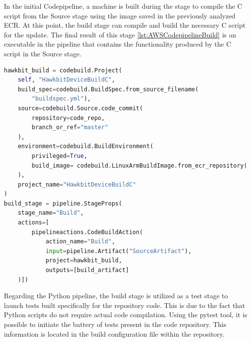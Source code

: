 In the initial Codepipeline, a machine is built during the stage to compile the C script from the Source stage using the image saved in the previously analyzed ECR. At this point, the build stage can compile and build the necessary C script for the update. The final result of this stage \ref{lst:AWSCodepipelineBuild} is an executable in the pipeline that contains the functionality produced by the C script in the Source stage.
\begin{lstlisting}[language=Python, caption={CDK Code for the Codecommit build stage set up}, label=lst:AWSCodepipelineBuild]
hawkbit_build = codebuild.Project(
    self, "HawkbitDeviceBuildC",
    build_spec=codebuild.BuildSpec.from_source_filename(
        "buildspec.yml"),
    source=codebuild.Source.code_commit(
        repository=code_repo,
        branch_or_ref="master"
    ),
    environment=codebuild.BuildEnvironment(
        privileged=True,
        build_image= codebuild.LinuxArmBuildImage.from_ecr_repository( ecr_repository, "v1")
    ),
    project_name="HawkbitDeviceBuildC"
)
build_stage = pipeline.StageProps(
    stage_name="Build",
    actions=[
        pipelineactions.CodeBuildAction(
            action_name="Build",
            input=pipeline.Artifact("SourceArtifact"),
            project=hawkbit_build,
            outputs=[build_artifact]
    )])
\end{lstlisting}

Regarding the Python pipeline, the build stage is utilized as a test stage to launch tests built specifically for the repository code. This is due to the fact that Python scripts do not require actual code compilation. Using the pytest tool, it is possible to initiate the battery of tests present in the code repository. This information is located in the build configuration file within the repository.

